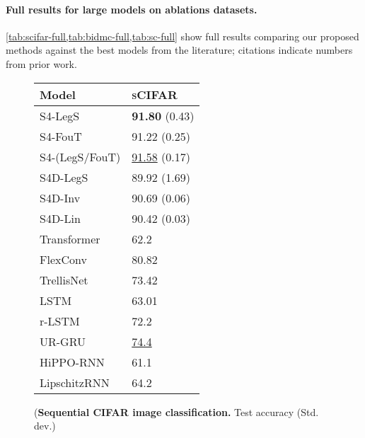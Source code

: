 \documentclass{article}
\begin{document}
\paragraph{Full results for large models on ablations datasets.}


\cref{tab:scifar-full,tab:bidmc-full,tab:sc-full} show full results comparing our proposed methods against the best models from the literature; citations indicate numbers from prior work.

\begin{figure}[!t]
  \small
\begin{minipage}[t]{0.35\linewidth}
  \small
  \centering
  \captionsetup{type=table}
  \caption{
    (\textbf{Sequential CIFAR image classification.} Test accuracy (Std. dev.)
  }
  \begin{tabular}{@{}ll@{}}
    \toprule
    Model                                      & \textsc{sCIFAR}          \\
    \midrule
    S4-LegS                                    & \textbf{91.80} (0.43)    \\
    S4-FouT                                    & 91.22 (0.25)             \\
    S4-(LegS/FouT)                             & \underline{91.58} (0.17) \\
    \midrule
    S4D-LegS                                   & 89.92 (1.69)             \\
    S4D-Inv                                    & 90.69 (0.06)             \\
    S4D-Lin                                    & 90.42 (0.03)             \\
    \midrule
    Transformer~\citep{trinh2018learning}      & 62.2                     \\
    FlexConv~\citep{romero2022flexconv}        & 80.82                    \\
    TrellisNet~\citep{trellisnet}              & 73.42                    \\
    LSTM~\citep{lstm,gu2020improving}          & 63.01                    \\
    r-LSTM~\citep{trinh2018learning}          & 72.2                     \\
    UR-GRU~\citep{gu2020improving}             & \underline{74.4}         \\
    HiPPO-RNN~\citep{gu2020hippo}              & 61.1                     \\
    LipschitzRNN~\citep{erichson2021lipschitz} & 64.2                     \\

\end{tabular}
\end{minipage}
\end{figure}
\end{document}
